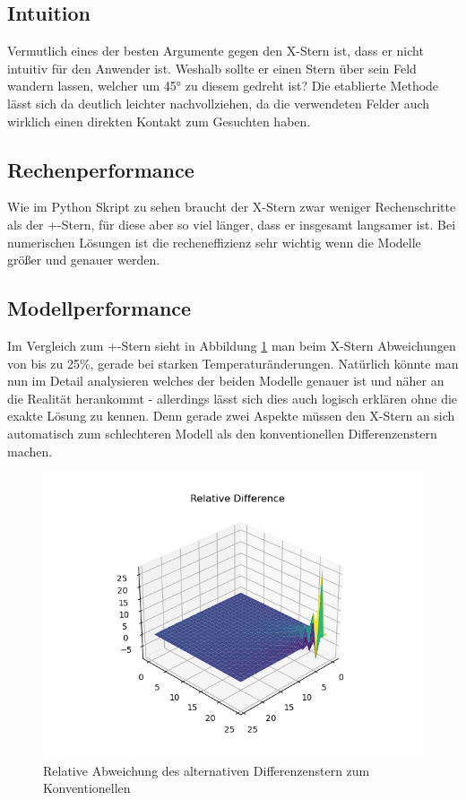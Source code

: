\documentclass[twoside,10pt,a4paper]{article}
\numberwithin{equation}{section}					%
\numberwithin{figure}{section}						%
\begin{document}
\subsection{Intuition}
Vermutlich eines der besten Argumente gegen den X-Stern ist, dass er nicht intuitiv für den Anwender ist. Weshalb sollte er einen Stern über sein Feld wandern lassen, welcher um 45° zu diesem gedreht ist? Die etablierte Methode lässt sich da deutlich leichter nachvollziehen, da die verwendeten Felder auch wirklich einen direkten Kontakt zum Gesuchten haben.

\subsection{Rechenperformance}
Wie im Python Skript zu sehen braucht der X-Stern zwar weniger Rechenschritte als der +-Stern, für diese aber so viel länger, dass er insgesamt langsamer ist. Bei numerischen Lösungen ist die recheneffizienz sehr wichtig wenn die Modelle größer und genauer werden.

\subsection{Modellperformance}
Im Vergleich zum +-Stern sieht in Abbildung \ref{fig:relative} man beim X-Stern Abweichungen von bis zu 25\%, gerade bei starken Temperaturänderungen. Natürlich könnte man nun im Detail analysieren welches der beiden Modelle genauer ist und näher an die Realität herankommt - allerdings lässt sich dies auch logisch erklären ohne die exakte Lösung zu kennen. Denn gerade zwei Aspekte müssen den X-Stern an sich automatisch zum schlechteren Modell als den konventionellen Differenzenstern machen.\\
\begin{figure}[H]
        \centering
        \includegraphics[width=\textwidth]{bilder/rel diff 2.png}
        \caption{Relative Abweichung des alternativen Differenzenstern zum Konventionellen}
        \label{fig:relative}
    \end{figure}
\end{document}
